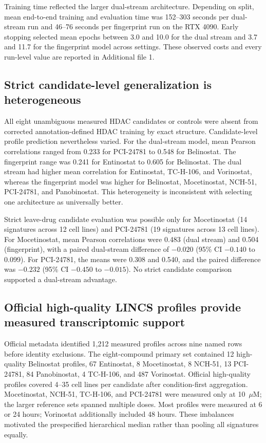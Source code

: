 \begin{minorrevision}
Training time reflected the larger dual-stream architecture. Depending on split, mean end-to-end training and evaluation time was 152--303 seconds per dual-stream run and 46--76 seconds per fingerprint run on the RTX 4090. Early stopping selected mean epochs between 3.0 and 10.0 for the dual stream and 3.7 and 11.7 for the fingerprint model across settings. These observed costs and every run-level value are reported in Additional file 1.\par
\end{minorrevision}

\subsection{Strict candidate-level generalization is heterogeneous}

All eight unambiguous measured HDAC candidates or controls were absent from corrected annotation-defined HDAC training by exact structure. Candidate-level profile prediction nevertheless varied. For the dual-stream model, mean Pearson correlations ranged from 0.233 for PCI-24781 to 0.548 for Belinostat. The fingerprint range was 0.241 for Entinostat to 0.605 for Belinostat. The dual stream had higher mean correlation for Entinostat, TC-H-106, and Vorinostat, whereas the fingerprint model was higher for Belinostat, Mocetinostat, NCH-51, PCI-24781, and Panobinostat. This heterogeneity is inconsistent with selecting one architecture as universally better.

Strict leave-drug candidate evaluation was possible only for Mocetinostat (14 signatures across 12 cell lines) and PCI-24781 (19 signatures across 13 cell lines). For Mocetinostat, mean Pearson correlations were 0.483 (dual stream) and 0.504 (fingerprint), with a paired dual-stream difference of $-0.020$ (95\% CI $-0.140$ to 0.099). For PCI-24781, the means were 0.308 and 0.540, and the paired difference was $-0.232$ (95\% CI $-0.450$ to $-0.015$). No strict candidate comparison supported a dual-stream advantage.

\subsection{Official high-quality LINCS profiles provide measured transcriptomic support}

Official metadata identified 1,212 measured profiles across nine named rows before identity exclusions. The eight-compound primary set contained 12 high-quality Belinostat profiles, 67 Entinostat, 8 Mocetinostat, 8 NCH-51, 13 PCI-24781, 84 Panobinostat, 4 TC-H-106, and 487 Vorinostat. Official high-quality profiles covered 4--35 cell lines per candidate after condition-first aggregation. Mocetinostat, NCH-51, TC-H-106, and PCI-24781 were measured only at 10~$\mu$M; the larger reference sets spanned multiple doses. Most profiles were measured at 6 or 24 hours; Vorinostat additionally included 48 hours. These imbalances motivated the prespecified hierarchical median rather than pooling all signatures equally.

